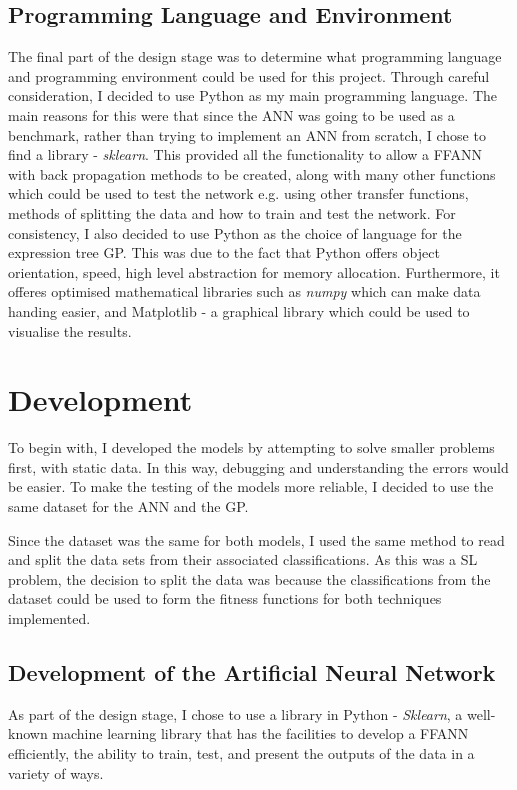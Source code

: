 \documentclass[11pt]{article}
\begin{document}
\subsection{Programming Language and Environment}\label{subsec:PLE}
The final part of the design stage was to determine what programming language and programming environment could be used for this project. Through careful consideration, I decided to use Python as my main programming language. The main reasons for this were that since the ANN was going to be used as a benchmark, rather than trying to implement an ANN from scratch, I chose to find a library - \textit{sklearn}. This provided all the functionality to allow a FFANN with back propagation methods to be created, along with many other functions which could be used to test the network e.g. using other transfer functions, methods of splitting the data and how to train and test the network. For consistency, I also decided to use Python as the choice of language for the expression tree GP. This was due to the fact that Python offers object orientation, speed, high level abstraction for memory allocation. Furthermore, it offeres optimised mathematical libraries such as \textit{numpy} which can make data handing easier, and Matplotlib  - a graphical library which could be used to visualise the results. 
\section{Development}\label{subsubsec:DEV}
To begin with, I developed the models by attempting to solve smaller problems first, with static data. In this way, debugging and understanding the errors would be easier. To make the testing of the models more reliable, I decided to use the same dataset for the ANN and the GP. 

Since the dataset was the same for both models, I used the same method to read and split the data sets from their associated classifications. As this was a SL problem, the decision to split the data was because the classifications from the dataset could be used to form the fitness functions for both techniques implemented.
\subsection{Development of the Artificial Neural Network}\label{subsec:devANN}
As part of the design stage, I chose to use a library in Python - \textit{Sklearn}, a well-known machine learning library that has the facilities to develop a FFANN efficiently, the ability to train, test, and present the outputs of the data in a variety of ways. 
\end{document}
